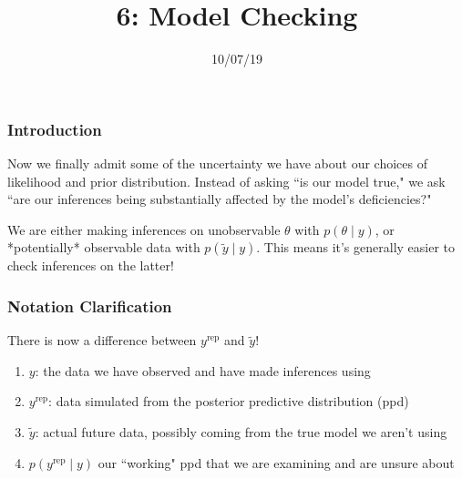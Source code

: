 \documentclass{beamer}
\title["6"]{6: Model Checking}
\date{10/07/19}
\begin{document}

\begin{frame}
\titlepage 
\end{frame}

\begin{frame}
\frametitle{Introduction}

Now we finally admit some of the uncertainty we have about our choices of likelihood and prior distribution. Instead of asking ``is our  model true," we ask ``are our inferences being substantially affected by the model's deficiencies?"
\newline

We are either making inferences on unobservable $\theta$ with $p(\theta \mid y)$, or *potentially* observable data with $p(\tilde{y} \mid y)$. This means it's generally easier to check inferences on the latter!

\end{frame}

\begin{frame}
\frametitle{Notation Clarification}

There is now a difference between $y^{\text{rep}}$ and $\tilde{y}$!
\newline

\begin{enumerate}
\item $y$: the data we have observed and have made inferences using
\item $y^{\text{rep}}$: data simulated from the posterior predictive distribution (ppd)
\item $\tilde{y}$: actual future data, possibly coming from the \*true\* model we aren't using
\item $p(y^{\text{rep}} \mid y)$ our ``working" ppd that we are examining and are unsure about
\end{enumerate}


\end{frame}
\end{document}
